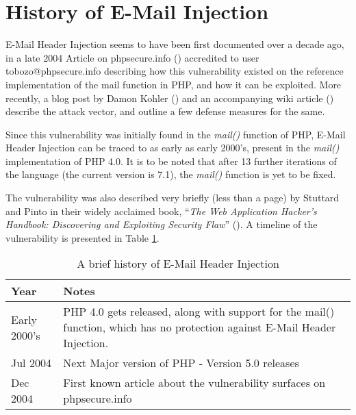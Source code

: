 \section{History of E-Mail Injection}

E-Mail Header Injection seems to have been first documented over a decade ago, in a late 2004 Article on phpsecure.info (\cite{Tobozo}) accredited to user tobozo@phpsecure.info describing how this vulnerability existed on the reference implementation of the mail function in PHP, and how it can be exploited. More recently, a blog post by Damon Kohler (\cite{DK}) and an accompanying wiki article (\cite{Injection}) describe the attack vector, and outline a few defense measures for the same.

Since this vulnerability was initially found in the \emph{mail()} function of PHP, E-Mail Header Injection can be traced to as early as early 2000's, present in the \emph{mail()} implementation of PHP 4.0. It is to be noted that after 13 further iterations of the language (the current version is 7.1), the \emph{mail()} function is yet to be fixed.

The vulnerability was also described very briefly (less than a page) by Stuttard and Pinto in their widely acclaimed book, ``\emph{The Web Application Hacker's Handbook: Discovering and Exploiting Security Flaw}'' (\cite{stuttard2011web}). 
A timeline of the vulnerability is presented in Table \ref{tab:history}.

\begin{table}[!htbp]
	\centering
	\begin{tabular}{|p{2cm}|p{10cm}|}
		\hline
		Year & Notes\\
		\hline
		{Early 2000's} & {PHP 4.0 gets released, along with support for the mail() function, which has no protection against E-Mail Header Injection.}\\
		\hline
		{Jul 2004} & {Next Major version of PHP - Version 5.0 releases}\\
		\hline
		{Dec 2004} & {First known article about the vulnerability surfaces on phpsecure.info}\\
		\hline		
	\end{tabular}
	\caption{A brief history of E-Mail Header Injection}
	\label{tab:history}
\end{table}